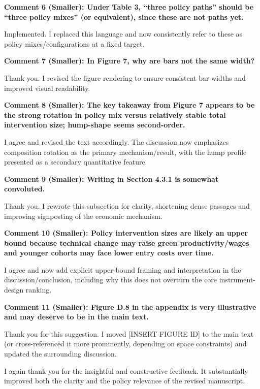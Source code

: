 \documentclass[12pt]{article}
\begin{document}
\begin{onehalfspacing}
\bigskip
\bigskip

\textbf{Comment 6 (Smaller): Under Table 3, ``three policy paths'' should be ``three policy mixes'' (or equivalent), since these are not paths yet.}

\medskip

Implemented. I replaced this language and now consistently refer to these as policy mixes/configurations at a fixed target.

\bigskip
\bigskip

\textbf{Comment 7 (Smaller): In Figure 7, why are bars not the same width?}

\medskip

Thank you. I revised the figure rendering to ensure consistent bar widths and improved visual readability.

\bigskip
\bigskip

\textbf{Comment 8 (Smaller): The key takeaway from Figure 7 appears to be the strong rotation in policy mix versus relatively stable total intervention size; hump-shape seems second-order.}

\medskip

I agree and revised the text accordingly. The discussion now emphasizes composition rotation as the primary mechanism/result, with the hump profile presented as a secondary quantitative feature.

\bigskip
\bigskip

\textbf{Comment 9 (Smaller): Writing in Section 4.3.1 is somewhat convoluted.}

\medskip

Thank you. I rewrote this subsection for clarity, shortening dense passages and improving signposting of the economic mechanism.

\bigskip
\bigskip

\textbf{Comment 10 (Smaller): Policy intervention sizes are likely an upper bound because technical change may raise green productivity/wages and younger cohorts may face lower entry costs over time.}

\medskip

I agree and now add explicit upper-bound framing and interpretation in the discussion/conclusion, including why this does not overturn the core instrument-design ranking.

\bigskip
\bigskip

\textbf{Comment 11 (Smaller): Figure D.8 in the appendix is very illustrative and may deserve to be in the main text.}

\medskip

Thank you for this suggestion. I moved [INSERT FIGURE ID] to the main text (or cross-referenced it more prominently, depending on space constraints) and updated the surrounding discussion.

\bigskip

I again thank you for the insightful and constructive feedback. It substantially improved both the clarity and the policy relevance of the revised manuscript.

\end{onehalfspacing}
\end{document}
